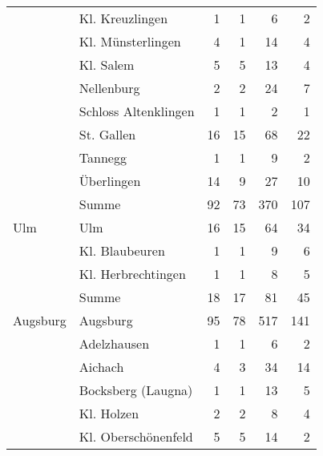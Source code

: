 \begin{xltabular}{\textwidth}{X l R R R R}

	& Kl. Kreuzlingen
	& 1
	& 1
	& 6
	& 2
	\\

	& Kl. Münsterlingen
	& 4
	& 1
	& 14
	& 4
	\\

	& Kl. Salem
	& 5
	& 5
	& 13
	& 4
	\\

	& Nellenburg
	& 2
	& 2
	& 24
	& 7
	\\

	& Schloss Altenklingen
	& 1
	& 1
	& 2
	& 1
	\\

	& St. Gallen
	& 16
	& 15
	& 68
	& 22
	\\

	& Tannegg
	& 1
	& 1
	& 9
	& 2
	\\

	& Überlingen
	& 14
	& 9
	& 27
	& 10
	\\


	& Summe
	& 92
	& 73
	& 370
	& 107
	\\

\midrule

Ulm
	& Ulm
	& 16
	& 15
	& 64
	& 34
	\\

	& Kl. Blaubeuren
	& 1
	& 1
	& 9
	& 6
	\\

	& Kl. Herbrechtingen
	& 1
	& 1
	& 8
	& 5
	\\


	& Summe
	& 18
	& 17
	& 81
	& 45
	\\

\midrule

Augsburg
	& Augsburg
	& 95
	& 78
	& 517
	& 141
	\\

	& Adelzhausen
	& 1
	& 1
	& 6
	& 2
	\\

	& Aichach
	& 4
	& 3
	& 34
	& 14
	\\

	& Bocksberg (Laugna)
	& 1
	& 1
	& 13
	& 5
	\\

	& Kl. Holzen
	& 2
	& 2
	& 8
	& 4
	\\

	& Kl. Oberschönenfeld
	& 5
	& 5
	& 14
	& 2
	\\


\end{xltabular}
